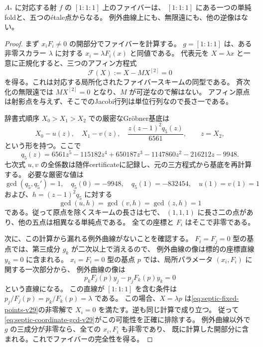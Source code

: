 \begin{lemma}[一つの二重点と五つの単純点]
\label{lem:septic-simple-fold-v29}
$A_*$ に対応する射 $f$ の $[1:1:1]$ 上のファイバーは、
$[1:1:1]$ にある一つの単純foldと、五つの\'etale点からなる。
例外曲線上にも、無限遠にも、他の逆像はない。
\end{lemma}

\begin{proof}
まず $x_iF_i\ne0$ の開部分でファイバーを計算する。
$g=[1:1:1]$ は、ある非零スカラー $\lambda$ に対する
$x_i=\lambda F_i(x)$ と同値である。
代表元を $X=\lambda x$ と一意に正規化すると、三つのアフィン方程式
\begin{equation}\label{eq:septic-fixed-points-v29}
 \mathcal F(X):=X-MX^{[2]}=0
\end{equation}
を得る。これは対応する局所化されたファイバースキームの同型である。
斉次化の無限遠では $MX^{[2]}=0$ となり、$M$ が可逆なので解はない。
アフィン原点は射影点を与えず、そこでのJacobi行列は単位行列なので長さ一である。

辞書式順序 $X_0>X_1>X_2$ での厳密なGr\"obner基底は
\[
 X_0-u(z),\quad X_1-v(z),\quad
 \frac{z(z-1)^2q_5(z)}{6561},\qquad z=X_2,
\]
という形を持つ。ここで
\begin{equation}\label{eq:septic-qfive-v29}
 q_5(z)=6561z^5-115182z^4+650187z^3
       -1147860z^2-216212z-9948.
\end{equation}
七次式 $u,v$ の全係数は随伴certificateに記録し、元の三方程式から基底を再計算する。
必要な厳密な値は
\[
 \gcd(q_5,q_5')=1,\quad q_5(0)=-9948,\quad q_5(1)=-832454,
 \quad u(1)=v(1)=1
\]
および、$h=(z-1)^2q_5$ に対する
\begin{equation}\label{eq:septic-coordinate-gcd-v29}
 \gcd(u,h)=\gcd(v,h)=\gcd(z,h)=1
\end{equation}
である。従って原点を除くスキームの長さは七で、
$(1,1,1)$ に長さ二の点があり、他の五点は相異なる単純点である。
全ての座標と $F_i$ はそこで非零である。

次に、この計算から漏れる例外曲線がないことを確認する。
$F_i=F_j=0$ 型の基点では、第三成分 $g_k$ が二次以上で消えるので、
例外曲線の像は標的の座標直線 $y_k=0$ に含まれる。
$x_i=F_i=0$ 型の基点 $p$ では、局所パラメータ $(x_i,F_i)$ に関する一次部分から、
例外曲線の像は
\[
 p_kF_j(p)y_j-p_jF_k(p)y_k=0
\]
という直線になる。
この直線が $[1:1:1]$ を含む条件は
$p_j/F_j(p)=p_k/F_k(p)=\lambda$ である。
この場合、$X=\lambda p$ は\eqref{eq:septic-fixed-points-v29}の非零解で
$X_i=0$ を満たす。逆も同じ計算で成り立つ。
従って\eqref{eq:septic-coordinate-gcd-v29}がこの可能性を正確に排除する。
例外曲線以外で $g$ の三成分が非零なら、全ての $x_i,F_i$ も非零であり、
既に計算した開部分に含まれる。これでファイバーの完全性を得る。


\end{proof}

